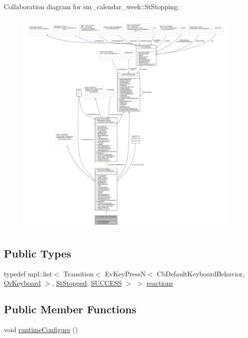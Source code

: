 Collaboration diagram for sm\+\_\+calendar\+\_\+week\+:\+:St\+Stopping\+:
\nopagebreak
\begin{figure}[H]
\begin{center}
\leavevmode
\includegraphics[width=350pt]{structsm__calendar__week_1_1StStopping__coll__graph}
\end{center}
\end{figure}
\subsection*{Public Types}
\begin{DoxyCompactItemize}
\item 
typedef mpl\+::list$<$ Transition$<$ Ev\+Key\+PressN$<$ Cb\+Default\+Keyboard\+Behavior, \hyperlink{classsm__calendar__week_1_1OrKeyboard}{Or\+Keyboard} $>$, \hyperlink{structsm__calendar__week_1_1StStopped}{St\+Stopped}, \hyperlink{classSUCCESS}{S\+U\+C\+C\+E\+SS} $>$ $>$ \hyperlink{structsm__calendar__week_1_1StStopping_a31b3ab71de004a3a6e9c3aef8b4363c7}{reactions}
\end{DoxyCompactItemize}
\subsection*{Public Member Functions}
\begin{DoxyCompactItemize}
\item 
void \hyperlink{structsm__calendar__week_1_1StStopping_ac685a0abee3b023694487970173e77a0}{runtime\+Configure} ()
\end{DoxyCompactItemize}
